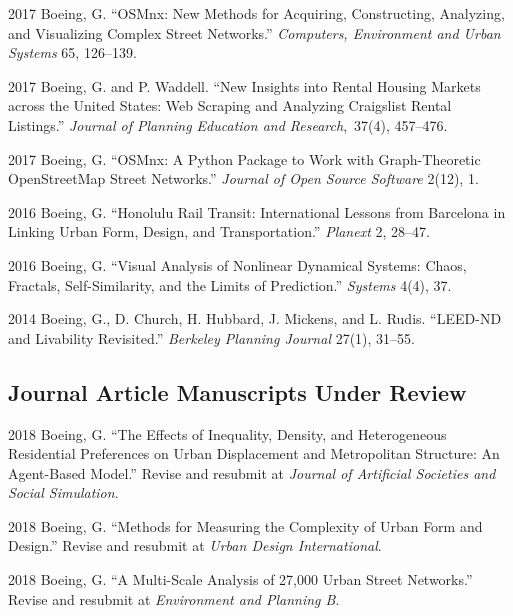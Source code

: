 \documentclass{academiccv}
\begin{document}
\begin{tablist}

\item[2017] \tab Boeing, G. \enquote{OSMnx: New Methods for Acquiring, Constructing, Analyzing, and Visualizing Complex Street Networks.} \emph{Computers, Environment and Urban Systems} 65, 126--139.

\item[2017] \tab Boeing, G. and P. Waddell. \enquote{New Insights into Rental Housing Markets across the United States: Web Scraping and Analyzing Craigslist Rental Listings.} \emph{Journal of Planning Education and Research}, 37(4), 457--476.

\item[2017] \tab Boeing, G. \enquote{OSMnx: A Python Package to Work with Graph-Theoretic OpenStreetMap Street Networks.} \emph{Journal of Open Source Software} 2(12), 1.

\item[2016] \tab Boeing, G. \enquote{Honolulu Rail Transit: International Lessons from Barcelona in Linking Urban Form, Design, and Transportation.} \emph{Planext} 2, 28--47.

\item[2016] \tab Boeing, G. \enquote{Visual Analysis of Nonlinear Dynamical Systems: Chaos, Fractals, Self-Similarity, and the Limits of Prediction.} \emph{Systems} 4(4), 37.

\item[2014] \tab Boeing, G., D. Church, H. Hubbard, J. Mickens, and L. Rudis. \enquote{LEED-ND and Livability Revisited.} \emph{Berkeley Planning Journal} 27(1), 31--55.

\end{tablist}



\subsection*{Journal Article Manuscripts Under Review}

\begin{tablist}

\item[2018] \tab Boeing, G. \enquote{The Effects of Inequality, Density, and Heterogeneous Residential Preferences on Urban Displacement and Metropolitan Structure: An Agent-Based Model.} Revise and resubmit at \emph{Journal of Artificial Societies and Social Simulation}.

\item[2018] \tab Boeing, G. \enquote{Methods for Measuring the Complexity of Urban Form and Design.} Revise and resubmit at \emph{Urban Design International}.

\item[2018] \tab Boeing, G. \enquote{A Multi-Scale Analysis of 27,000 Urban Street Networks.} Revise and resubmit at \emph{Environment and Planning B}.

\end{tablist}
\end{document}
